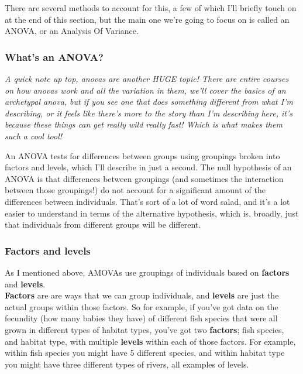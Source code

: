 \documentclass[
]{article}
\begin{document}
There are several methods to account for this, a few of which I'll
briefly touch on at the end of this section, but the main one we're
going to focus on is called an ANOVA, or an Analysis Of Variance.

\hypertarget{whats-an-anova}{%
\subsubsection{What's an ANOVA?}\label{whats-an-anova}}

\emph{A quick note up top, anovas are another HUGE topic! There are
entire courses on how anovas work and all the variation in them, we'll
cover the basics of an archetypal anova, but if you see one that does
something different from what I'm describing, or it feels like there's
more to the story than I'm describing here, it's because these things
can get really wild really fast! Which is what makes them such a cool
tool!}

An ANOVA tests for differences between groups using groupings broken
into factors and levels, which I'll describe in just a second. The null
hypothesis of an ANOVA is that differences between groupings (and
sometimes the interaction between those groupings!) do not account for a
significant amount of the differences between individuals. That's sort
of a lot of word salad, and it's a lot easier to understand in terms of
the alternative hypothesis, which is, broadly, just that individuals
from different groups will be different.

\hypertarget{factors-and-levels}{%
\subsubsection{Factors and levels}\label{factors-and-levels}}

As I mentioned above, AMOVAs use groupings of individuals based on
\textbf{factors} and \textbf{levels}.\\
\textbf{Factors} are are ways that we can group individuals, and
\textbf{levels} are just the actual groups within those factors. So for
example, if you've got data on the fecundity (how many babies they have)
of different fish species that were all grown in different types of
habitat types, you've got two \textbf{factors}; fish species, and
habitat type, with multiple \textbf{levels} within each of those
factors. For example, within fish species you might have 5 different
species, and within habitat type you might have three different types of
rivers, all examples of levels.
\end{document}
